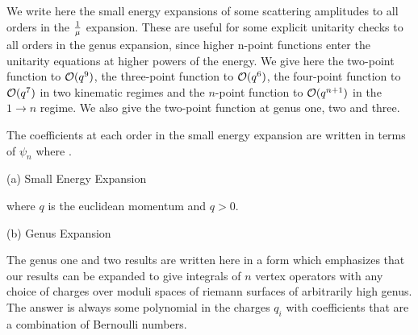  
 
We write here the small energy expansions of some scattering amplitudes to
all orders in the $1\over \mu$ expansion. These are useful for some explicit
unitarity checks to all orders in the genus expansion, since higher n-point
functions enter the unitarity equations at higher powers of the energy. We
give  here the two-point function to ${\cal O}(q^9)$,  the three-point function
to ${\cal O}(q^6)$, the four-point function to ${\cal O}(q^7)$ in  two kinematic
regimes and the $n$-point  
function to ${\cal O}(q^{n+1})$ in the $1\to n$ regime. 
We also give the two-point function at genus one, two and three.  
 
The coefficients at each order in 
the small energy expansion are written in terms of $\psi_n$ where
\eqn{}.  
 
 
 
(a) Small Energy Expansion
 
\eqn{}
where $q$ is the euclidean momentum and $q>0$.
 
\medskip
 
(b) Genus Expansion
 
The genus one and two results are written here in a form which emphasizes
that our results can be expanded to give  integrals of $n$ vertex operators
with any choice of charges over moduli spaces of riemann surfaces 
of arbitrarily high genus. The answer is always some polynomial in the charges
$q_i$ with coefficients that are a combination of Bernoulli numbers.  
 
 \eqn{}
 
\eqn{}
 

